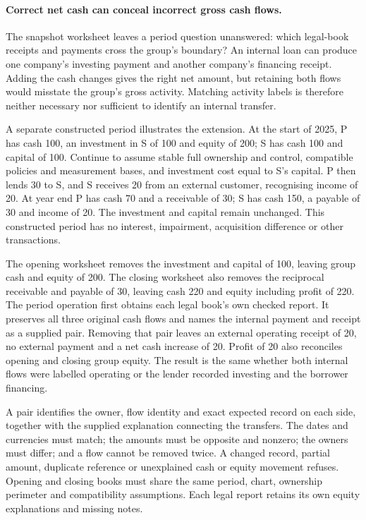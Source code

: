\newpage
\paragraph{Correct net cash can conceal incorrect gross cash flows.}
The snapshot worksheet leaves a period question unanswered: which legal-book
receipts and payments cross the group's boundary? An internal loan can produce
one company's investing payment and another company's financing receipt.
Adding the cash changes gives the right net amount, but retaining both flows
would misstate the group's gross activity. Matching activity labels is therefore
neither necessary nor sufficient to identify an internal transfer.

A separate constructed period illustrates the extension. At the start of
2025, P has cash 100, an investment in S of 100 and equity of 200; S has cash
100 and capital of 100. Continue to assume stable full ownership and control,
compatible policies and measurement bases, and investment cost equal to S's
capital. P then lends 30 to S, and S receives 20 from an external customer,
recognising income of 20. At year end P has cash 70 and a receivable of 30;
S has cash 150, a payable of 30 and income of 20. The investment and capital
remain unchanged. This constructed period has no interest, impairment,
acquisition difference or other transactions.

The opening worksheet removes the investment and capital of 100, leaving
group cash and equity of 200. The closing worksheet also removes the reciprocal
receivable and payable of 30, leaving cash 220 and equity including profit of
220. The period operation first obtains each legal book's own checked report.
It preserves all three original cash flows and names the internal payment and
receipt as a supplied pair. Removing that pair leaves an external operating
receipt of 20, no external payment and a net cash increase of 20. Profit of
20 also reconciles opening and closing group equity. The result is the same
whether both internal flows were labelled operating or the lender recorded
investing and the borrower financing.

A pair identifies the owner, flow identity and exact expected record on each
side, together with the supplied explanation connecting the transfers.
The dates and currencies must match; the amounts must be opposite and nonzero;
the owners must differ; and a flow cannot be removed twice. A changed record,
partial amount, duplicate reference or unexplained cash or equity movement
refuses. Opening and closing books must share the same period, chart,
ownership perimeter and compatibility assumptions. Each legal report retains
its own equity explanations and missing notes.

